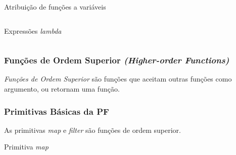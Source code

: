 
\begin{listing}[H]
  \centering
  \caption{Atribuição de funções a variáveis}
  \inputminted[frame=lines,
               framesep=2mm,
               baselinestretch=1.2,
               fontsize=\scriptsize, %
               linenos,
               mathescape]
               {js}{code/fp_first_class_functions.js}
  \label{code:fp_first_class_functions}
\end{listing}

\begin{listing}[H]
  \centering
  \caption{Expressões \emph{lambda}}
  \inputminted[frame=lines,
               framesep=2mm,
               baselinestretch=1.2,
               fontsize=\scriptsize, %
               linenos,
               mathescape]
               {js}{code/fp_lambdas.js}
  \label{code:fp_lambdas}
\end{listing}

\subsubsection{Funções de Ordem Superior \emph{(Higher-order Functions)}}

\emph{Funções de Ordem Superior} são funções que aceitam outras funções como
argumento, ou retornam uma função.



\subsubsection{Primitivas Básicas da PF}
\label{sec:primitivas-pf}


As primitivas \emph{map} e \emph{filter} são funções de ordem superior.

\begin{listing}[H]
  \centering
  \caption{Primitiva \emph{map}}
  \inputminted[frame=lines,
               framesep=2mm,
               baselinestretch=1.2,
               fontsize=\scriptsize, %
               linenos,
               mathescape]
               {js}{code/fp_primitives_map.js}
  \label{code:fp_primitives_map}
\end{listing}

